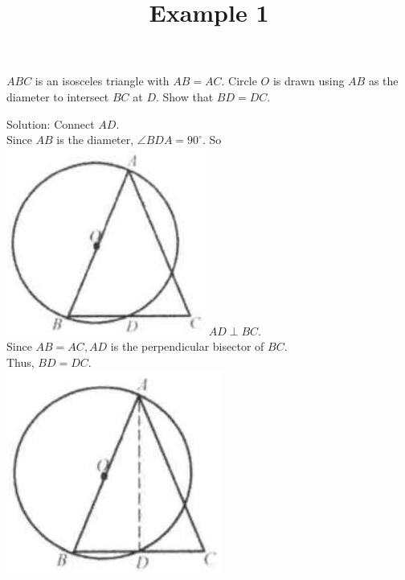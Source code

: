 \documentclass{article}
\title{Example 1}
\date{}
\begin{document}
\maketitle

\(A B C\) is an isosceles triangle with \(A B=A C\). Circle \(O\) is drawn using \(A B\) as the diameter to intersect \(B C\) at \(D\). Show that \(B D=D C\).

Solution:
Connect \(A D\).\\
Since \(A B\) is the diameter, \(\angle B D A=90^{\circ}\). So\\
\includegraphics[width=\textwidth]{images/problem_image_1.jpg} \(A D \perp B C\).\\
Since \(A B=A C, A D\) is the perpendicular bisector of \(B C\).\\
Thus, \(B D=D C\).\\
\centering
\includegraphics[width=\textwidth]{images/reasoning_image_1.jpg}
\end{document}

